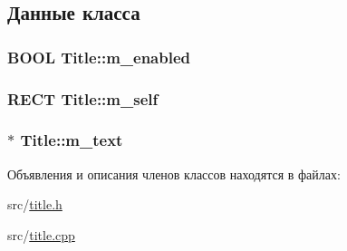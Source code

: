 \subsection{Данные класса}
\hypertarget{class_title_a374521b2a74b12b55ba0ae6d4904c160}{
\subsubsection[{m\-\_\-enabled}]{\setlength{\rightskip}{0pt plus 5cm}B\-O\-O\-L Title\-::m\-\_\-enabled\hspace{0.3cm}{\ttfamily [protected]}}}\label{class_title_a374521b2a74b12b55ba0ae6d4904c160}
\hypertarget{class_title_a00304405a1542fdaba6f4c9cb050745e}{
\subsubsection[{m\-\_\-self}]{\setlength{\rightskip}{0pt plus 5cm}R\-E\-C\-T Title\-::m\-\_\-self\hspace{0.3cm}{\ttfamily [protected]}}}\label{class_title_a00304405a1542fdaba6f4c9cb050745e}
\hypertarget{class_title_a3a45d82e549ad158d440c5a3b79f155c}{
\subsubsection[{m\-\_\-text}]{$\ast$ Title\-::m\-\_\-text\hspace{0.3cm}{\ttfamily [protected]}}}\label{class_title_a3a45d82e549ad158d440c5a3b79f155c}


Объявления и описания членов классов находятся в файлах\-:\begin{DoxyCompactItemize}
\item 
src/\hyperlink{title_8h}{title.\-h}\item 
src/\hyperlink{title_8cpp}{title.\-cpp}\end{DoxyCompactItemize}
